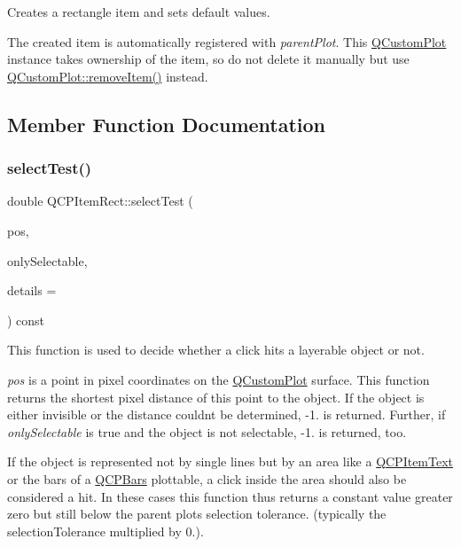 Creates a rectangle item and sets default values.

The created item is automatically registered with {\itshape parent\+Plot}. This \mbox{\hyperlink{class_q_custom_plot}{Q\+Custom\+Plot}} instance takes ownership of the item, so do not delete it manually but use \mbox{\hyperlink{class_q_custom_plot_ae04446557292551e8fb6e2c106e1848d}{Q\+Custom\+Plot\+::remove\+Item()}} instead. 

\subsection{Member Function Documentation}
\mbox{\label{class_q_c_p_item_rect_a2e68621b75bae4da6ae0ab2cdd0dd733}} 
\subsubsection{\texorpdfstring{select\+Test()}{selectTest()}}
{\footnotesize\ttfamily double Q\+C\+P\+Item\+Rect\+::select\+Test (\begin{DoxyParamCaption}\item[{const Q\+PointF \&}]{pos,  }\item[{bool}]{only\+Selectable,  }\item[{Q\+Variant $\ast$}]{details = {} }\end{DoxyParamCaption}) const\hspace{0.3cm}{\ttfamily [virtual]}}

This function is used to decide whether a click hits a layerable object or not.

{\itshape pos} is a point in pixel coordinates on the \mbox{\hyperlink{class_q_custom_plot}{Q\+Custom\+Plot}} surface. This function returns the shortest pixel distance of this point to the object. If the object is either invisible or the distance couldn\textquotesingle{}t be determined, -\/1. is returned. Further, if {\itshape only\+Selectable} is true and the object is not selectable, -\/1. is returned, too.

If the object is represented not by single lines but by an area like a \mbox{\hyperlink{class_q_c_p_item_text}{Q\+C\+P\+Item\+Text}} or the bars of a \mbox{\hyperlink{class_q_c_p_bars}{Q\+C\+P\+Bars}} plottable, a click inside the area should also be considered a hit. In these cases this function thus returns a constant value greater zero but still below the parent plot\textquotesingle{}s selection tolerance. (typically the selection\+Tolerance multiplied by 0.).


